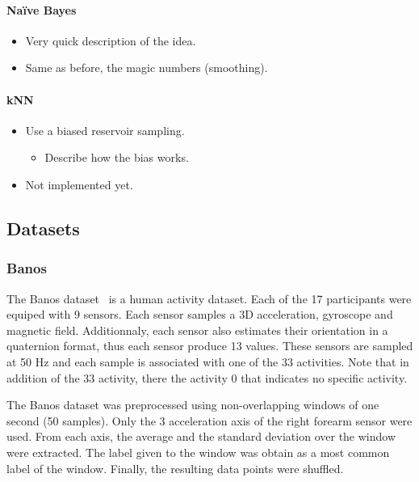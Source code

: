 \paragraph{Naïve Bayes~\cite{naive_bayes}}
\begin{itemize}
	\item Very quick description of the idea.
	\item Same as before, the magic numbers (smoothing).
\end{itemize}
\paragraph{kNN~\cite{biased_reservoir_sampling}}
\begin{itemize}
	\item Use a biased reservoir sampling.
	\begin{itemize}
		\item Describe how the bias works.
	\end{itemize}
	\item Not implemented yet.
\end{itemize}

\subsection{Datasets}
\subsubsection{Banos}
The Banos dataset~\cite{Banos_2014} is a human activity dataset. Each of the 17
participants were equiped with 9 sensors. Each sensor samples a 3D
acceleration, gyroscope and magnetic field. Additionnaly, each sensor also
estimates their orientation in a quaternion format, thus each sensor produce 13
values. These sensors are sampled at 50 Hz and each sample is associated with
one of the 33 activities. Note that in addition of the 33 activity, there the
activity 0 that indicates no specific activity.

The Banos dataset was preprocessed using non-overlapping windows of one second
(50 samples).  Only the 3 acceleration axis of the right forearm sensor were
used. From each axis, the average and the standard deviation over the window
were extracted. The label given to the window was obtain as a most common label of the window.
Finally, the resulting data points were shuffled.

